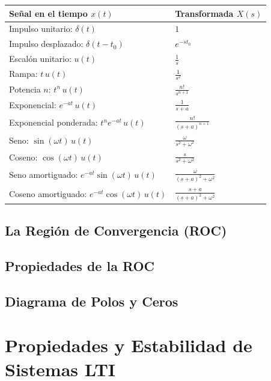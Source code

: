 \documentclass[11pt,a4paper,openany]{book}
\begin{document}
\begin{center}
	\begin{tabular}{ll}
		\hline
		\textbf{Señal en el tiempo $x(t)$} & \textbf{Transformada $X(s)$} \\
		\hline
		Impulso unitario: $\delta(t)$ & $1$ \\ 
		Impulso desplazado: $\delta(t-t_0)$ & $e^{-st_0}$ \\
		Escalón unitario: $u(t)$ & $\frac{1}{s}$ \\ 
		Rampa: $t \, u(t)$ & $\frac{1}{s^2}$ \\
		Potencia $n$: $t^n \, u(t)$ & $\frac{n!}{s^{n+1}}$ \\
		Exponencial: $e^{-at} \, u(t)$ & $\frac{1}{s+a}$ \\
		Exponencial ponderada: $t^n e^{-at} \, u(t)$ & $\frac{n!}{(s+a)^{n+1}}$ \\
		Seno: $\sin(\omega t) \, u(t)$ & $\frac{\omega}{s^2+\omega^2}$ \\
		Coseno: $\cos(\omega t) \, u(t)$ & $\frac{s}{s^2+\omega^2}$ \\
		Seno amortiguado: $e^{-at}\sin(\omega t) \, u(t)$ & $\frac{\omega}{(s+a)^2+\omega^2}$ \\
		Coseno amortiguado: $e^{-at}\cos(\omega t) \, u(t)$ & $\frac{s+a}{(s+a)^2+\omega^2}$ \\
		\hline
	\end{tabular}
\end{center}

\section{La Región de Convergencia (ROC)}

\section{Propiedades de la ROC}

\section{Diagrama de Polos y Ceros}

\chapter{Propiedades y Estabilidad de Sistemas LTI}
\end{document}
